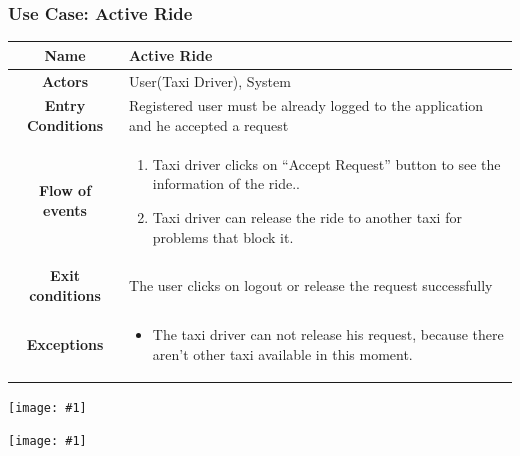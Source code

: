 \documentclass[11pt, a4paper,titlepage]{article}
\newcommand{\image}[1]{
	\begin{center}
		\noindent \texttt{[image: \#1]}
	\end{center}
	}
\begin{document}
\subsubsection{Use Case: Active Ride}
		\begin{tabularx}{\textwidth}{| c | X |}
			\hline
			\textbf{Name} & 
			Active Ride
			\\
			\hline
			\textbf{Actors} & 
			User(Taxi Driver), System 
			\\
			\hline
			\textbf{Entry Conditions} &
			Registered user must be already logged to the application and he accepted a request
			\\
			\hline
			\textbf{Flow of events} & 
			\begin{enumerate}
				\item Taxi driver clicks on “Accept Request” button to see the information of the ride..
				\item Taxi driver can release the ride to another taxi for problems that block it.
			\end{enumerate}						
			\\
			\hline
			\textbf{Exit conditions} & 
			The user clicks on logout or release the request successfully
			\\
			\hline
			\textbf{Exceptions} & 
			\begin{itemize}
				\item The taxi driver can not release his request, because there aren’t other taxi available in this moment.
			\end{itemize} 
			\\
			\hline		
		\end{tabularx}
		\image{usecase_active_ride.png}
		\image{diagram_sequence_active_ride.png}
		\newpage
\end{document}
